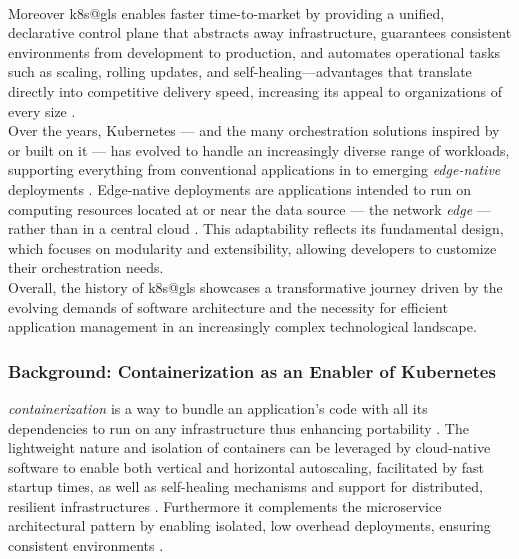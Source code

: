 \documentclass[11pt, a4paper, oneside, listof=totoc]{scrartcl}
\begin{document}
                \\
                Moreover \gls{k8s@gls} enables faster time-to-market by providing a unified,
                declarative control plane that abstracts away infrastructure,
                guarantees consistent environments from development to production,
                and automates operational tasks such as scaling, rolling updates,
                and self-healing—advantages that translate directly into competitive delivery speed,
                increasing its appeal to organizations of every size
                \parencite[pp.~858--859]{damarapati2025}.
                \\
                Over the years, Kubernetes --- and the many orchestration solutions inspired by or
                built on it --- has evolved to handle an increasingly diverse range of workloads,
                supporting everything from conventional applications in to emerging
                \textit{edge-native} deployments \parencites[p.~21]{biot2025}[pp.~1--4]{biot2025}.
                Edge-native deployments are applications intended to run on computing
                resources located at or near the data source --- the network \textit{edge} ---
                rather than in a central cloud \parencite[p.~34]{satyanarayanan2019}.
                This adaptability reflects its fundamental design, which focuses on modularity and
                extensibility, allowing developers to customize their orchestration needs.
                \\
                Overall, the history of \gls{k8s@gls} showcases a transformative journey driven by the
                evolving demands of software architecture and the necessity for efficient
                application management in an increasingly complex technological landscape.

            \subsubsection{Background: Containerization as an Enabler of Kubernetes}\label{subsubsec:containerization}
                \textit{\Gls{containerization}} is a way to bundle an application's code with all its
                dependencies to run on any infrastructure thus enhancing portability
                \parencite{awsWhatIsContainerization,dockerWhatContainer}.
                The lightweight nature and isolation of \glspl{container} can be leveraged by
                cloud-native software to enable both vertical and horizontal autoscaling,
                facilitated by fast startup times, as well as self-healing mechanisms and support
                for distributed, resilient infrastructures
                \parencites{kubernetesAutoscalingWorkloads}{kubernetesSelfHealing}
                    {awsWhatIsContainerization}[pp.~58--59]{davis2019}.
                Furthermore it complements the microservice architectural pattern by enabling
                isolated, low overhead deployments, ensuring consistent environments
                \parencite[p.~209]{balalaie2016}.
\end{document}
